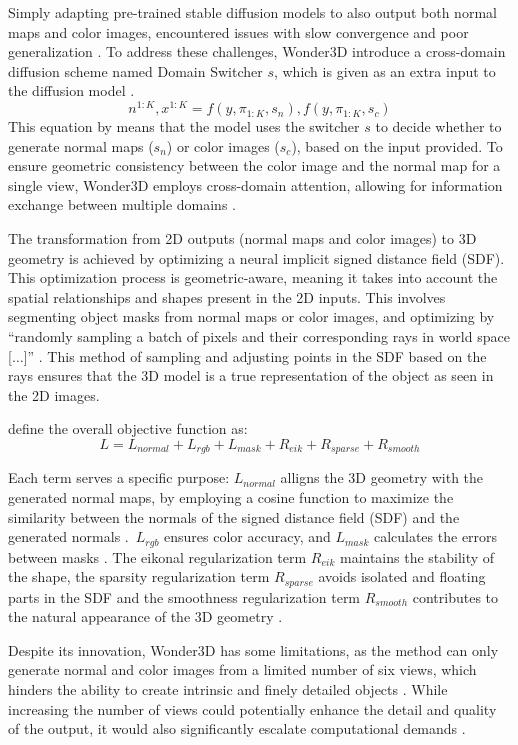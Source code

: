 Simply adapting pre-trained stable diffusion models to also output both normal maps and color images, encountered issues with slow convergence and poor generalization \citep{long2023wonder3d}. To address these challenges, Wonder3D introduce a cross-domain diffusion scheme named Domain Switcher \(s\), which is given as an extra input to the diffusion model \citep{long2023wonder3d}. \[
  n^{1:K}, x^{1:K} = f(y, \pi_{1:K}, s_n), f(y, \pi_{1:K}, s_c)
\] This equation by \citeauthor{long2023wonder3d} means that the model uses the switcher \( s \) to decide whether to generate normal maps (\( s_n \)) or color images (\( s_c \)), based on the input provided. To ensure geometric consistency between the color image and the normal map for a single view, Wonder3D employs cross-domain attention, allowing for information exchange between multiple domains \citep{long2023wonder3d}.

The transformation from 2D outputs (normal maps and color images) to 3D geometry is achieved by optimizing a neural implicit signed distance field (SDF). This optimization process is geometric-aware, meaning it takes into account the spatial relationships and shapes present in the 2D inputs. This involves segmenting object masks from normal maps or color images, and optimizing by ``randomly sampling a batch of pixels and their corresponding rays in world space [\(\ldots\)]'' \citep{long2023wonder3d}. This method of sampling and adjusting points in the SDF based on the rays ensures that the 3D model is a true representation of the object as seen in the 2D images.

\citeauthor{long2023wonder3d} define the overall objective function as: \[ L = L_{normal} + L_{rgb} + L_{mask} + R_{eik} + R_{sparse} + R_{smooth} \]

Each term serves a specific purpose: \( L_{normal} \) alligns the 3D geometry with the generated normal maps, by employing a cosine function to maximize the similarity between the normals of the signed distance field (SDF) and the generated normals \citep{long2023wonder3d}.~\( L_{rgb} \) ensures color accuracy, and \( L_{mask} \) calculates the errors between masks \citep{long2023wonder3d}. The eikonal regularization term \( R_{eik} \) maintains the stability of the shape, the sparsity regularization term \( R_{sparse} \) avoids isolated and floating parts in the SDF and the smoothness regularization term \( R_{smooth} \) contributes to the natural appearance of the 3D geometry \citep{long2023wonder3d}.

Despite its innovation, Wonder3D has some limitations, as the method can only generate normal and color images from a limited number of six views, which hinders the ability to create intrinsic and finely detailed objects \citep{long2023wonder3d}.  While increasing the number of views could potentially enhance the detail and quality of the output, it would also significantly escalate computational demands \citep{long2023wonder3d}.